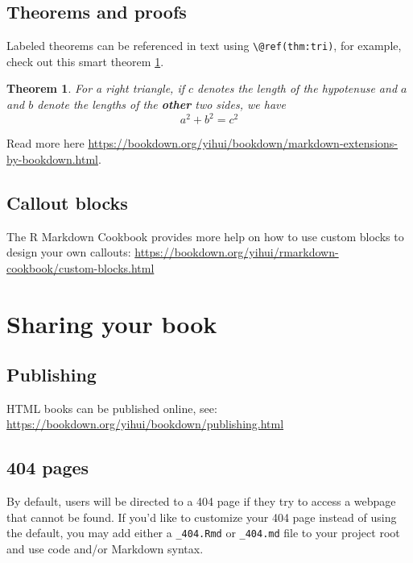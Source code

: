 \documentclass[
  12pt,
]{book}
\newtheorem{theorem}{Theorem}[chapter]
\theoremstyle{definition}
\theoremstyle{definition}
\theoremstyle{definition}
\theoremstyle{definition}
\theoremstyle{remark}
\begin{document}
\hypertarget{theorems-and-proofs}{%
\section{Theorems and proofs}\label{theorems-and-proofs}}

Labeled theorems can be referenced in text using \texttt{\textbackslash{}@ref(thm:tri)}, for example, check out this smart theorem \ref{thm:tri}.

\begin{theorem}
\protect\hypertarget{thm:tri}{}\label{thm:tri}For a right triangle, if \(c\) denotes the \emph{length} of the hypotenuse
and \(a\) and \(b\) denote the lengths of the \textbf{other} two sides, we have
\[a^2 + b^2 = c^2\]
\end{theorem}

Read more here \url{https://bookdown.org/yihui/bookdown/markdown-extensions-by-bookdown.html}.

\hypertarget{callout-blocks}{%
\section{Callout blocks}\label{callout-blocks}}

The R Markdown Cookbook provides more help on how to use custom blocks to design your own callouts: \url{https://bookdown.org/yihui/rmarkdown-cookbook/custom-blocks.html}

\hypertarget{sharing-your-book}{%
\chapter{Sharing your book}\label{sharing-your-book}}

\hypertarget{publishing}{%
\section{Publishing}\label{publishing}}

HTML books can be published online, see: \url{https://bookdown.org/yihui/bookdown/publishing.html}

\hypertarget{pages}{%
\section{404 pages}\label{pages}}

By default, users will be directed to a 404 page if they try to access a webpage that cannot be found. If you'd like to customize your 404 page instead of using the default, you may add either a \texttt{\_404.Rmd} or \texttt{\_404.md} file to your project root and use code and/or Markdown syntax.
\end{document}
